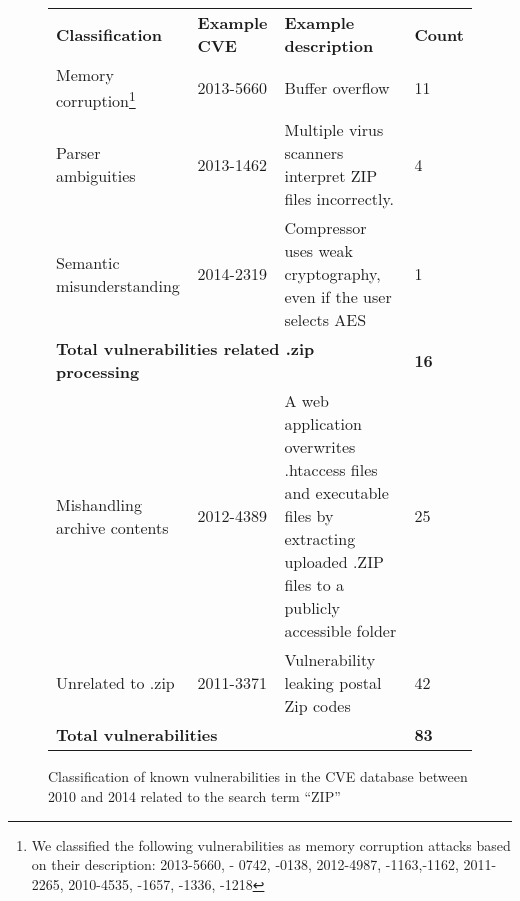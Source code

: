 
\begin{figure}
\begin{tabular}{@{}llll @{}}
 \bf Classification & \bf Example CVE & \bf Example description & \bf Count\\
  Memory corruption\footnote{We classified the following vulnerabilities as memory corruption
    attacks based on their description: 2013-5660, - 0742, -0138, 2012-4987, -1163,-1162, 2011-2265,
    2010-4535, -1657, -1336, -1218} & 2013-5660 & Buffer overflow & 11\\
  Parser ambiguities & 2013-1462 & Multiple virus scanners interpret ZIP files incorrectly.& 4\\
  Semantic misunderstanding & 2014-2319 & Compressor uses weak cryptography, even if the user
  selects AES & 1\\
  \multicolumn{3}{l}{\bf Total vulnerabilities related .zip processing }& \bf 16  \\  
  Mishandling archive contents &  2012-4389 & A web application overwrites .htaccess files and
  executable files by extracting uploaded .ZIP files to a publicly accessible folder  & 25\\
   Unrelated to .zip &2011-3371& Vulnerability leaking postal Zip codes & 42\\
  \multicolumn{3}{l}{\bf Total vulnerabilities} & \bf 83\\ 
  
\end{tabular}
\caption{Classification of known vulnerabilities in the CVE database between 2010 and 2014 related to the search term ``ZIP''}
\label{fig:motivation} 
\end{figure}